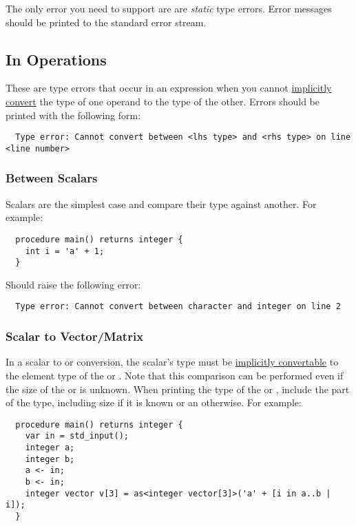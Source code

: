 \documentclass[../gazprea.tex]{subfiles}
\begin{document}
The only error you need to support are are \textit{static} type errors. Error messages should be
printed to the standard error stream.


\subsection{In Operations}
\label{ssec:error_ops}
These are type errors that occur in an expression when you cannot
\hyperref[sec:typePromotion]{implicitly convert} the type of one operand to the type of the other.
Errors should be printed with the following form:
\begin{lstlisting}
  Type error: Cannot convert between <lhs type> and <rhs type> on line <line number>
\end{lstlisting}

\subsubsection{Between Scalars}
\label{sssec:error_ops_stos}
Scalars are the simplest case and compare their type against another. For example:
\begin{lstlisting}
  procedure main() returns integer {
    int i = 'a' + 1;
  }
\end{lstlisting}

Should raise the following error:
\begin{lstlisting}
  Type error: Cannot convert between character and integer on line 2
\end{lstlisting}

\subsubsection{Scalar to Vector/Matrix}
\label{sssec:error_ops_stovm}
\label{sssec:error_ops_stov}
\label{sssec:error_ops_stom}
In a scalar to  or  conversion, the scalar's type must be
\hyperref[sec:typePromotion]{implicitly convertable} to the element type of the  or
. Note that this comparison can be performed even if the size of the  or
 is unknown. When printing the type of the  or , include the
 part of the type, including size if it is known or an \code{*} otherwise. For example:
\begin{lstlisting}
  procedure main() returns integer {
    var in = std_input();
    integer a;
    integer b;
    a <- in;
    b <- in;
    integer vector v[3] = as<integer vector[3]>('a' + [i in a..b | i]);
  }
\end{lstlisting}
\end{document}
